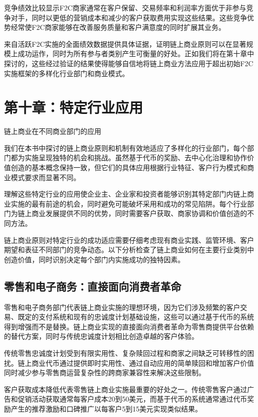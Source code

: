 \documentclass[
  Letterpaper,
]{scrbook}
\begin{document}
竞争绩效比较显示F2C商家通常在客户保留、交易频率和利润率方面优于非参与竞争对手，同时以更低的营销成本和减少的客户获取费用实现这些结果。这些竞争优势经常使F2C商家能够在改善服务质量和客户满意度的同时扩展其业务。

来自活跃F2C实施的全面绩效数据提供具体证据，证明链上商业原则可以在显著规模上成功运作，同时为所有参与者类别产生可衡量的好处。正如我们将在第十章中探讨的，这些经过验证的结果使得能够自信地将链上商业方法应用于超出初始F2C实施框架的多样化行业部门和商业模式。

\chapter{第十章：特定行业应用}\label{sec-industry-applications}

链上商业在不同商业部门的应用

我们在本书中探讨的链上商业原则和机制有效地适应了多样化的行业部门，每个部门都为实施呈现独特的机会和挑战。虽然基于代币的奖励、去中心化治理和协作价值创造的基本概念保持一致，但它们的具体应用根据行业特征、客户行为模式和商业模式要求而显著不同。

理解这些特定行业的应用使企业主、企业家和投资者能够识别其特定部门内链上商业实施的最有前途的机会，同时避免可能破坏采用和成功的常见陷阱。每个行业部门为链上商业发展提供不同的优势，同时需要客户获取、商家协调和价值创造的不同方法。

链上商业原则对特定行业的成功适应需要仔细考虑现有商业实践、监管环境、客户期望和表征不同部门的竞争动态。以下分析检查了链上商业如何在主要行业类别中创造价值，同时识别决定每个部门内实施成功的独特因素。

\section{零售和电子商务：直接面向消费者革命}\label{ux96f6ux552eux548cux7535ux5b50ux5546ux52a1ux76f4ux63a5ux9762ux5411ux6d88ux8d39ux8005ux9769ux547d}

零售和电子商务部门代表链上商业实施的理想环境，因为它们涉及频繁的客户交易、既定的支付系统和现有的忠诚度计划基础设施，这些可以通过基于代币的系统得到增强而不是替换。链上商业实现的直接面向消费者革命为零售商提供平台依赖的替代方案，同时与传统忠诚度计划相比创造卓越的客户体验。

传统零售忠诚度计划受到有限实用性、复杂赎回过程和商家之间缺乏可转移性的困扰。链上商业代币通过提供即时实用性、通过自动应用的简单赎回和增加客户价值同时减少参与零售商运营复杂性的跨商家兼容性来解决这些限制。

客户获取成本降低代表零售链上商业实施最重要的好处之一。传统零售客户通过广告和促销活动获取通常每客户成本20到50美元，而基于代币的系统通常通过代币奖励产生的推荐激励和口碑推广以每客户5到15美元实现类似结果。
\end{document}
